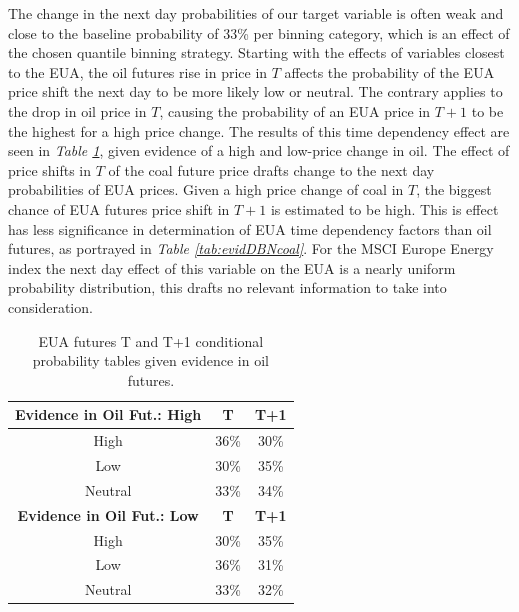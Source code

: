 \documentclass[12pt, letterpaper]{article}
\begin{document}
The change in the next day probabilities of our target variable is often weak and close to the baseline probability of 33\% per binning category, which is an effect of the chosen quantile binning strategy. Starting with the effects of variables closest to the EUA, the oil futures rise in price in $T$ affects the probability of the EUA price shift the next day to be more likely low or neutral. The contrary applies to the drop in oil price in $T$, causing the probability of an EUA price in $T+1$ to be the highest for a high price change. The results of this time dependency effect are seen in \textit{Table \ref{tab:evidDBNoil}}, given evidence of a high and low-price change in oil. The effect of price shifts in $T$ of the coal future price drafts change to the next day probabilities of EUA prices. Given a high price change of coal in $T$, the biggest chance of EUA futures price shift in $T+1$ is estimated to be high. This is effect has less significance in determination of EUA time dependency factors than oil futures, as portrayed in \textit{Table \ref{tab:evidDBNcoal}}. For the MSCI Europe Energy index the next day effect of this variable on the EUA is a nearly uniform probability distribution, this drafts no relevant information to take into consideration.

\begin{table}[ht]
\centering
\small
\begin{tabular}{|c|c|c|}
\hline
\textbf{Evidence in Oil Fut.: High} & \textbf{T} & \textbf{T+1} \\
\hline
High & 36\% & 30\% \\
Low & 30\% & 35\% \\
Neutral & 33\% & 34\% \\
\hline
\textbf{Evidence in Oil Fut.: Low} & \textbf{T} & \textbf{T+1} \\
\hline
High & 30\% & 35\% \\
Low & 36\% & 31\% \\
Neutral & 33\% & 32\% \\
\hline
\end{tabular}
\caption{EUA futures T and T+1 conditional probability tables given evidence in oil futures.}
\label{tab:evidDBNoil}
\end{table}
\end{document}
